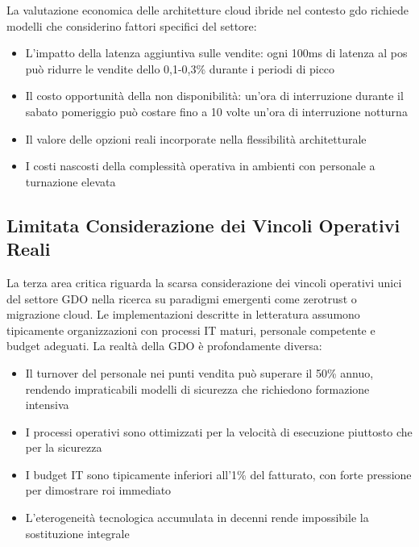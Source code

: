 La valutazione economica delle architetture cloud ibride nel contesto \gls{gdo} richiede modelli che considerino fattori specifici del settore:
\begin{itemize}
\item L'impatto della latenza aggiuntiva sulle vendite: ogni 100ms di latenza al \gls{pos} può ridurre le vendite dello 0,1-0,3\% durante i periodi di picco
\item Il costo opportunità della non disponibilità: un'ora di interruzione durante il sabato pomeriggio può costare fino a 10 volte un'ora di interruzione notturna
\item Il valore delle opzioni reali incorporate nella flessibilità architetturale
\item I costi nascosti della complessità operativa in ambienti con personale a turnazione elevata
\end{itemize}

\subsection{\texorpdfstring{Limitata Considerazione dei Vincoli Operativi Reali}{1.2.3 - Limitata Considerazione dei Vincoli Operativi Reali}}
\label{subsec:vincoli_operativi}

La terza area critica riguarda la scarsa considerazione dei vincoli operativi unici del settore GDO nella ricerca su paradigmi emergenti come \gls{zerotrust} o migrazione cloud. Le implementazioni descritte in letteratura assumono tipicamente organizzazioni con processi IT maturi, personale competente e budget adeguati. La realtà della GDO è profondamente diversa:

\begin{itemize}
\item Il turnover del personale nei punti vendita può superare il 50\% annuo, rendendo impraticabili modelli di sicurezza che richiedono formazione intensiva
\item I processi operativi sono ottimizzati per la velocità di esecuzione piuttosto che per la sicurezza
\item I budget IT sono tipicamente inferiori all'1\% del fatturato, con forte pressione per dimostrare \gls{roi} immediato
\item L'eterogeneità tecnologica accumulata in decenni rende impossibile la sostituzione integrale
\end{itemize}

